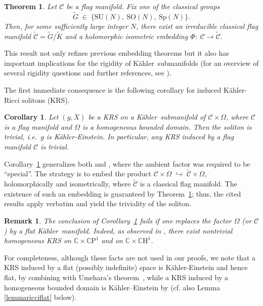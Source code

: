 \documentclass[reqno]{amsart}
\newcommand{\C}{\mathds{C}}
\newcommand{\CP}{\mathds{C}\mathrm{P}}
\newcommand{\CH}{\mathds{C}\mathrm{H}}
\newcommand{\K}{K\"{a}hler}
\newtheorem{theor}{Theorem}[section]
\newtheorem{cor}{Corollary}
\newtheorem{remark}{Remark}
\begin{document}
\begin{theor}\label{mainteoremb}
Let $\mathcal C$ be a flag manifold.  
Fix one of the classical groups
\[
   \tilde G\;\in\;\bigl\{\mathrm{SU}(N),\ \mathrm{SO}(N),\ \mathrm{Sp}(N)\bigr\}.
\]
Then, for some \emph{sufficiently large} integer \(N\),  
there exist an irreducible classical flag manifold  
\(\tilde{\mathcal C}=\tilde G/\tilde K\) 
and a holomorphic isometric embedding  
$\Phi :\; \mathcal C \longrightarrow \tilde{\mathcal C}.$
\end{theor}

This result not only refines previous  embedding theorems but it also has important implications 
for the rigidity of \K\ submanifolds (for an overview of several rigidity questions and further references, see \cite{LMrighom}). 

The first immediate consequence is the following corollary for induced \K-Ricci solitons (KRS).



\begin{cor}\label{corolmainteor}
Let $(g,X)$ be a KRS on a \K\ submanifold of  $\mathcal C \times \Omega$, where $\mathcal C$ is a flag manifold and $\Omega$ is a homogeneous bounded domain.  
Then the soliton is \emph{trivial}, i.e.\ $g$ is \K-Einstein.  
In particular, any KRS induced by a flag manifold $\mathcal C$ is trivial.
\end{cor}


Corollary~\ref{corolmainteor} generalizes both
\cite[Theorem~1.1]{LMrighom} and
\cite[Corollary~1]{LMrighom}, where the ambient factor was required to be ``special''.  
The strategy is to embed the product
$
\mathcal C \times \Omega \;\hookrightarrow\; \tilde{\mathcal C} \times \Omega,
$
holomorphically and isometrically, where $\tilde{\mathcal C}$ is a classical flag manifold.
The existence of such an embedding is guaranteed by Theorem~\ref{mainteoremb}; thus, the cited results apply verbatim and yield the triviality of the soliton.


\begin{remark}\label{rem:cannot-extend-flat}\rm
The conclusion of Corollary~\ref{corolmainteor} fails if one replaces the factor $\Omega$ (or $\mathcal C$) by a flat \K\ manifold. Indeed, as observed in \cite[Remark~1]{LMrighom}, there exist nontrivial homogeneous KRS on $\C\times\CP^1$ and on $\C\times\CH^1$. 
\end{remark}
For completeness, although these facts are not used in our proofs, we note that a KRS induced by a flat (possibly indefinite) space is \K-Einstein and hence flat, by combining \cite[Theorem~1]{LMpams} with Umehara's theorem~\cite{UmearaEinstein}, while a KRS induced by a homogeneous bounded domain is \K--Einstein by \cite[Theorem~1.1(i)]{PRIMO} (cf. also Lemma \ref{lemmaricciflat} below).
\end{document}

